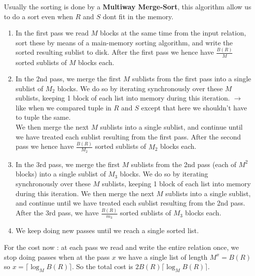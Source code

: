 \documentclass[12pt,a4paper]{article}
\begin{document}
Usually the sorting is done by a \textbf{Multiway Merge-Sort}, this algorithm allow us to do a sort even when $R$ and $S$ dont fit in the memory.\\
\begin{enumerate}
\item In the first pass we read $M$ blocks at the same time from the input relation, sort these by means of a main-memory sorting algorithm, and write the sorted resulting sublist to disk. After the first pass we hence have $\frac{B(R)}{M}$ sorted sublists of $M$ blocks each.
\item In the 2nd pass, we merge the first $M$ sublists from the first pass into a single sublist of $M_2$ blocks. We do so by iterating synchronously over these $M$ sublists, keeping 1 block of each list into memory during this iteration. $\longrightarrow$ like when we compared tuple in $R$ and $S$ except that here we shouldn't have to tuple the same. \\
We then merge the next $M$ sublists into a single sublist, and continue until we have treated each sublist resulting from the first pass. After the second pass we hence have $\frac{B(R)}{M_2}$ sorted sublists of $M_2$ blocks each.
\item In the 3rd pass, we merge the first $M$ sublists from the 2nd pass (each of $M^2$ blocks) into a single sublist of $M_3$ blocks. We do so by iterating synchronously over these $M$ sublists, keeping 1 block of each list into memory during this iteration. We then merge the next $M$ sublists into a single sublist, and continue until we have treated each sublist resulting from the 2nd pass. After the 3rd pass, we have $\frac{B(R)}{m_3}$ sorted sublists of $M_3$ blocks each.
\item We keep doing new passes until we reach a single sorted list.
\end{enumerate}
For the cost now : at each pass we read and write the entire relation once, we stop doing passes when at the pass $x$ we have a single list of length $M^x = B(R)$ so $x = \lceil \log_M B(R) \rceil$. So the total cost is $2B(R) \lceil \log_M B(R) \rceil$.\\
\end{document}
